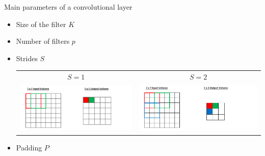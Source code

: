 \documentclass[handout]{beamer}
\begin{document}
\begin{frame}[t]{Main parameters of a convolutional layer}
\begin{itemize}
    \item <1-> \alert<1> {Size of the filter} $K$ 
    \item <2-> \alert<2> {Number of filters} $p$


    \item <3-> \alert<3> {Strides} $S$
    
     {
{\centering
\begin{tabular}{cc}
    $S=1$ & $S=2$ \\
    \includegraphics[trim={0.5cm 0 2.5cm 0}, clip, width=.5\textwidth]{fig/L2/Stride1.png}&
    \includegraphics[trim={0 0 2.5cm 0}, clip, width=.5\textwidth]{fig/L2/Stride2.png}\\
    \end{tabular}
    }}
    
    \item <4-> \alert<4> {Padding} $P$
    

\end{itemize}
\end{frame}
\end{document}
